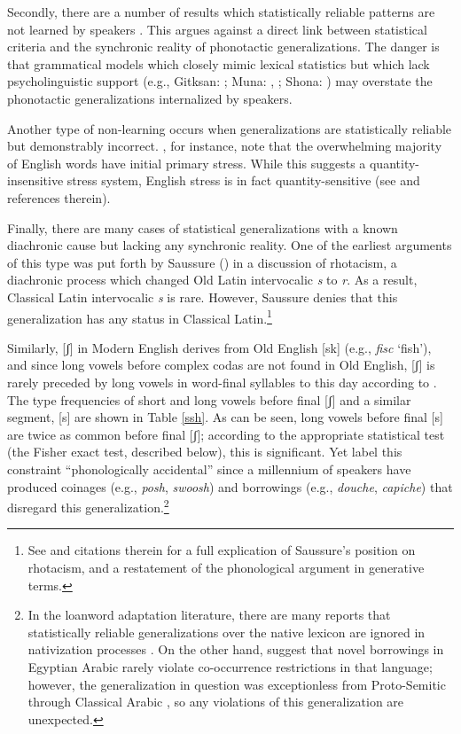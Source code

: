 Secondly, there are a number of results which statistically reliable patterns are not learned by speakers \citep[e.g.,][]{Becker2011,Hayes2006,Hayes2009,HayesInPress}. This argues against a direct link between statistical criteria and the synchronic reality of phonotactic generalizations. The danger is that grammatical models which closely mimic lexical statistics but which lack psycholinguistic support (e.g., Gitksan: \citealt{Brown2010}; Muna: \citealt{Anttila2008a}, \citealt{Coetzee2008a}; Shona: \citealt[][385]{Hayes2008a}) may overstate the phonotactic generalizations internalized by speakers. 

Another type of non-learning occurs when generalizations are statistically reliable but demonstrably incorrect. \citet{Legate2012}, for instance, note that the overwhelming majority of English words have initial primary stress. While this suggests a quantity-insensitive stress system, English stress is in fact quantity-sensitive (see \citealt{Halle1998c} and references therein). 

Finally, there are many cases of statistical generalizations with a known diachronic cause but lacking any synchronic reality. One of the earliest arguments of this type was put forth by Saussure (\citeyear[202f.]{CLG}) in a discussion of rhotacism, a diachronic process which changed Old Latin intervocalic \emph{s} to \emph{r}. As a result, Classical Latin intervocalic \emph{s} is rare. However, Saussure denies that this generalization has any status in Classical Latin.\footnote{See \citet{GormanInPressc} and citations therein for a full explication of Saussure's position on rhotacism, and a restatement of the phonological argument in generative terms.} 

Similarly, [ʃ] in Modern English derives from Old English [sk] (e.g., \emph{fisc} `fish'), and since long vowels before complex codas are not found in Old English, [ʃ] is rarely preceded by long vowels in word-final syllables to this day according to \citet{Iverson2005}. The type frequencies of short and long vowels before final [ʃ] and a similar segment, [s] are shown in Table \ref{ssh}. As can be seen, long vowels before final [s] are twice as common before final [ʃ]; according to the appropriate statistical test (the Fisher exact test, described below), this is significant. Yet \citet{Iverson2005} label this constraint ``phonologically accidental'' since a millennium of speakers have produced coinages (e.g., \emph{posh}, \emph{swoosh}) and  borrowings (e.g., \emph{douche}, \emph{capiche}) that disregard this generalization.\footnote{In the loanword adaptation literature, there are many reports that statistically reliable generalizations over the native lexicon are ignored in nativization processes \citep[e.g.,][]{Ito1995a,Ito1995b,Ussishkin2003}. On the other hand, \citet{Frisch2001} suggest that novel borrowings in Egyptian Arabic rarely violate co-occurrence restrictions in that language; however, the generalization in question was exceptionless from Proto-Semitic \citep{Ehret1989} through Classical Arabic \citep{Greenberg1950}, so any violations of this generalization are unexpected.}

